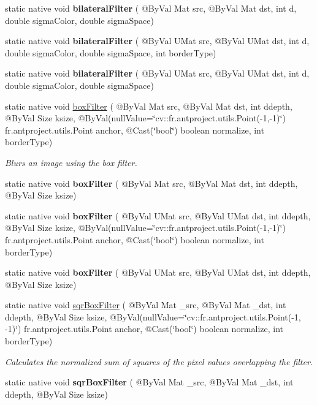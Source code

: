 \begin{DoxyCompactItemize}
static native void {\bfseries bilateral\+Filter} ( @By\+Val Mat src, @By\+Val Mat dst, int d, double sigma\+Color, double sigma\+Space)
\item 
static native void {\bfseries bilateral\+Filter} ( @By\+Val U\+Mat src, @By\+Val U\+Mat dst, int d, double sigma\+Color, double sigma\+Space, int border\+Type)
\item 
static native void {\bfseries bilateral\+Filter} ( @By\+Val U\+Mat src, @By\+Val U\+Mat dst, int d, double sigma\+Color, double sigma\+Space)
\item 
static native void \hyperlink{group__imgproc__filter_ga479aa13dd62a69ab5b1a1eac3324ab23}{box\+Filter} ( @By\+Val Mat src, @By\+Val Mat dst, int ddepth, @By\+Val Size ksize, @By\+Val(null\+Value=\char`\"{}cv\+::\+fr.antproject.utils.Point(-\/1,-\/1)\char`\"{}) fr.antproject.utils.Point anchor, @Cast(\char`\"{}bool\char`\"{}) boolean normalize, int border\+Type)
\begin{DoxyCompactList}\small\item\em Blurs an image using the box filter. \end{DoxyCompactList}\item 
static native void {\bfseries box\+Filter} ( @By\+Val Mat src, @By\+Val Mat dst, int ddepth, @By\+Val Size ksize)
\item 
static native void {\bfseries box\+Filter} ( @By\+Val U\+Mat src, @By\+Val U\+Mat dst, int ddepth, @By\+Val Size ksize, @By\+Val(null\+Value=\char`\"{}cv\+::\+fr.antproject.utils.Point(-\/1,-\/1)\char`\"{}) fr.antproject.utils.Point anchor, @Cast(\char`\"{}bool\char`\"{}) boolean normalize, int border\+Type)
\item 
static native void {\bfseries box\+Filter} ( @By\+Val U\+Mat src, @By\+Val U\+Mat dst, int ddepth, @By\+Val Size ksize)
\item 
static native void \hyperlink{group__imgproc__filter_gac3bb5f90c81da13be223978755c103e2}{sqr\+Box\+Filter} ( @By\+Val Mat \+\_\+src, @By\+Val Mat \+\_\+dst, int ddepth, @By\+Val Size ksize, @By\+Val(null\+Value=\char`\"{}cv\+::\+fr.antproject.utils.Point(-\/1, -\/1)\char`\"{}) fr.antproject.utils.Point anchor, @Cast(\char`\"{}bool\char`\"{}) boolean normalize, int border\+Type)
\begin{DoxyCompactList}\small\item\em Calculates the normalized sum of squares of the pixel values overlapping the filter. \end{DoxyCompactList}\item 
static native void {\bfseries sqr\+Box\+Filter} ( @By\+Val Mat \+\_\+src, @By\+Val Mat \+\_\+dst, int ddepth, @By\+Val Size ksize)

\end{DoxyCompactItemize}
